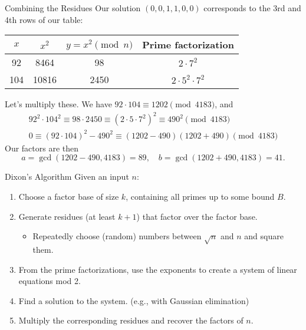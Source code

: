 \documentclass[aspectratio=169]{beamer}
\begin{document}
\begin{frame}{Combining the Residues}
  Our solution $(0, 0, 1, 1, 0, 0)$ corresponds to the 3rd and 4th rows of our table:

  \begin{tabular}{c|c|c|c}
    $x$ & $x^2$ & $y = x^2 \pmod{n}$ & Prime factorization \\
    \hline
    92 & 8464 & 98 & $2 \cdot 7^2$ \\
    104 & 10816 & 2450 & $2 \cdot 5^2 \cdot 7^2$ \\
  \end{tabular} \pause

  Let's multiply these.
  We have $92 \cdot 104 \equiv 1202 \pmod{4183}$, and
  \begin{align*}
  92^2 \cdot 104^2 \equiv 98 \cdot 2450
  \equiv (2 \cdot 5 \cdot 7^2)^2 \equiv 490^2 \pmod{4183} \\
    0 \equiv (92 \cdot 104)^2 - 490^2
    \equiv (1202-490)(1202+490) \pmod{4183}
  \end{align*}
  Our factors are then
  $$a = \gcd(1202-490, 4183) = 89,\quad b = \gcd(1202+490, 4183) = 41.$$
\end{frame}

\begin{frame}{Dixon's Algorithm}
  Given an input $n$:
  \begin{enumerate}
    \item Choose a factor base of size $k$, containing all primes up to some bound $B$. \pause
    \item Generate residues (at least $k+1$) that factor over the factor base.
    \begin{itemize}
      \item Repeatedly choose (random) numbers between $\sqrt{n}$ and $n$ and square them.
    \end{itemize} \pause
    \item From the prime factorizations, use the exponents
    to create a system of linear equations mod 2.
    \item Find a solution to the system. (e.g., with Gaussian elimination)
    \item Multiply the corresponding residues and recover the factors of $n$.
  \end{enumerate}
\end{frame}
\end{document}
